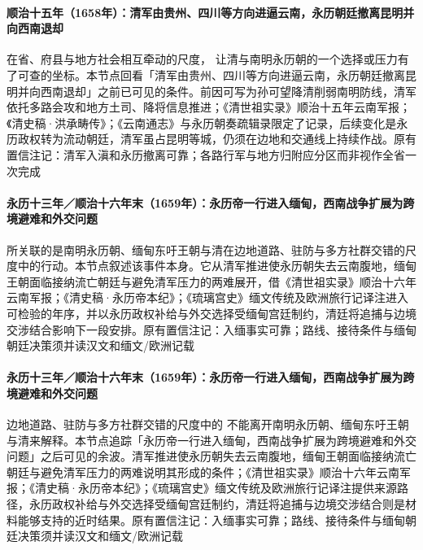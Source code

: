 \paragraph{顺治十五年（1658年）：清军由贵州、四川等方向进逼云南，永历朝廷撤离昆明并向西南退却}
在省、府县与地方社会相互牵动的尺度， 让清与南明永历朝的一个选择或压力有了可查的坐标。本节点回看「清军由贵州、四川等方向进逼云南，永历朝廷撤离昆明并向西南退却」之前已可见的条件。前因可写为孙可望降清削弱南明防线，清军依托多路会攻和地方土司、降将信息推进；《清世祖实录》顺治十五年云南军报；《清史稿·洪承畴传》；《云南通志》与永历朝奏疏辑录限定了记录，后续变化是永历政权转为流动朝廷，清军虽占昆明等城，仍须在边地和交通线上持续作战。原有置信注记：清军入滇和永历撤离可靠；各路行军与地方归附应分区而非视作全省一次完成

\paragraph{永历十三年／顺治十六年末（1659年）：永历帝一行进入缅甸，西南战争扩展为跨境避难和外交问题}
 所关联的是南明永历朝、缅甸东吁王朝与清在边地道路、驻防与多方社群交错的尺度中的行动。本节点叙述该事件本身。它从清军推进使永历朝失去云南腹地，缅甸王朝面临接纳流亡朝廷与避免清军压力的两难展开，借《清世祖实录》顺治十六年云南军报；《清史稿·永历帝本纪》；《琉璃宫史》缅文传统及欧洲旅行记译注进入可检验的年序，并以永历政权补给与外交选择受缅甸宫廷制约，清廷将追捕与边境交涉结合影响下一段安排。原有置信注记：入缅事实可靠；路线、接待条件与缅甸朝廷决策须并读汉文和缅文/欧洲记载

\paragraph{永历十三年／顺治十六年末（1659年）：永历帝一行进入缅甸，西南战争扩展为跨境避难和外交问题}
边地道路、驻防与多方社群交错的尺度中的 不能离开南明永历朝、缅甸东吁王朝与清来解释。本节点追踪「永历帝一行进入缅甸，西南战争扩展为跨境避难和外交问题」之后可见的余波。清军推进使永历朝失去云南腹地，缅甸王朝面临接纳流亡朝廷与避免清军压力的两难说明其形成的条件；《清世祖实录》顺治十六年云南军报；《清史稿·永历帝本纪》；《琉璃宫史》缅文传统及欧洲旅行记译注提供来源路径，永历政权补给与外交选择受缅甸宫廷制约，清廷将追捕与边境交涉结合则是材料能够支持的近时结果。原有置信注记：入缅事实可靠；路线、接待条件与缅甸朝廷决策须并读汉文和缅文/欧洲记载

